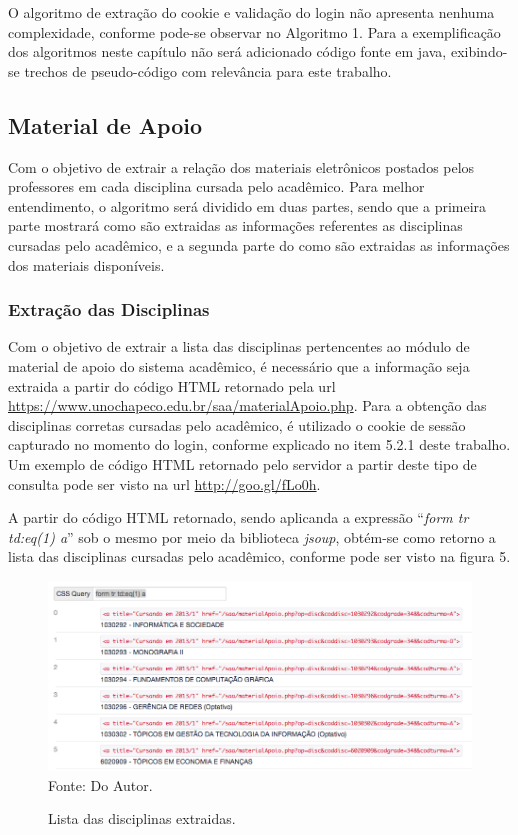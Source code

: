 O algoritmo de extração do cookie e validação do login não apresenta nenhuma complexidade, conforme pode-se observar no Algoritmo 1. Para a exemplificação dos algoritmos neste capítulo não será adicionado código fonte em java, exibindo-se trechos de pseudo-código com relevância para este trabalho.

\subsection{Material de Apoio}
Com o objetivo de extrair a relação dos materiais eletrônicos postados pelos professores em cada disciplina cursada pelo acadêmico. Para melhor entendimento, o algoritmo será dividido em duas partes, sendo que a primeira parte mostrará como são extraidas as informações referentes as disciplinas cursadas pelo acadêmico, e a segunda parte do como são extraidas as informações dos materiais disponíveis.


\subsubsection{Extração das Disciplinas}
Com o objetivo de extrair a lista das disciplinas pertencentes ao módulo de material de apoio do sistema acadêmico, é necessário que a informação seja extraida a partir do código HTML retornado pela url \url{https://www.unochapeco.edu.br/saa/materialApoio.php}. Para a obtenção das disciplinas corretas cursadas pelo acadêmico, é utilizado o cookie de sessão capturado no momento do login, conforme explicado no item 5.2.1 deste trabalho. Um exemplo de código HTML retornado pelo servidor a partir deste tipo de consulta pode ser visto na url \url{http://goo.gl/fLo0h}.

A partir do código HTML retornado, sendo aplicanda a expressão ``\emph{form tr td:eq(1) a}'' sob o mesmo por meio da biblioteca \emph{jsoup}, obtém-se como retorno a lista das disciplinas cursadas pelo acadêmico, conforme pode ser visto na figura 5.

\begin{figure}[!htb]
     \centering
     \caption[Extração de Informações - Lista de Disciplinas do Material de Apoio]{Lista das disciplinas extraidas.}
     \includegraphics[scale=0.5]{imagens/listadisciplinasmaterialapoio.png}
     \\ Fonte: Do Autor.
\end{figure}

